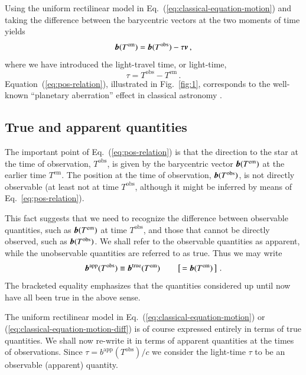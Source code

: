 \documentclass{aa}
\def\vec#1{\ensuremath{\mathchoice{\mbox{\boldmath$\displaystyle#1$}}
{\mbox{\boldmath$\textstyle#1$}}
{\mbox{\boldmath$\scriptstyle#1$}}
{\mbox{\boldmath$\scriptscriptstyle#1$}}}}
\begin{document}
Using the uniform rectilinear model in Eq.~(\ref{eq:classical-equation-motion})
and taking the difference between the barycentric vectors at the two moments
of time yields
\begin{equation}\label{eq:pos-relation}
    \vec{b}(T^\mathrm{em})=\vec{b}(T^\mathrm{obs})-\tau\vec{v} \, ,
\end{equation}
where we have introduced the light-travel time, or light-time,
\begin{equation}\label{eq:light-travel-time-definition}
    \tau=T^\mathrm{obs}-T^\mathrm{em} \, .
\end{equation}
Equation~(\ref{eq:pos-relation}), illustrated in Fig.~\ref{fig:1}, corresponds
to the well-known ``planetary aberration'' effect in classical astronomy
\citep[e.g.][]{woolard+clemence1966}.

\subsection{True and apparent quantities}

The important point of Eq.~(\ref{eq:pos-relation}) is that the direction to the
star at the time of observation, $T^\mathrm{obs}$, is given by the barycentric
vector $\vec{b}(T^\mathrm{em})$ at the earlier time $T^\mathrm{em}$.
The position at the time of observation, $\vec{b}(T^\mathrm{obs})$, is not
directly observable (at least not at time $T^\mathrm{obs}$, although it might
be inferred by means of Eq.~\ref{eq:pos-relation}).

This fact suggests that we need to recognize the difference between observable
quantities, such as $\vec{b}(T^\mathrm{em})$ at time $T^\mathrm{obs}$, and
those that cannot be directly observed, such as $\vec{b}(T^\mathrm{obs})$.
We shall refer to the observable quantities as apparent, while the
unobservable quantities are referred to as true. Thus we may write
\begin{equation}\label{eq:true-apparent}
   \vec{b}^\mathrm{app}(T^\mathrm{obs}) \equiv \vec{b}^\mathrm{true}(T^\mathrm{em})
   \quad\quad \left[\,= \vec{b}(T^\mathrm{em})\,\right] \, .
\end{equation}
The bracketed equality emphasizes that the quantities considered up until now have
all been true in the above sense.

The uniform rectilinear model in Eq.~(\ref{eq:classical-equation-motion})
or (\ref{eq:classical-equation-motion-diff}) is of course expressed entirely in terms
of true quantities. We shall now re-write it in terms of apparent quantities at the
times of observations. Since $\tau=b^\mathrm{app}(T^\mathrm{obs})/c$ we
consider the light-time $\tau$ to be an observable (apparent) quantity.
\end{document}
